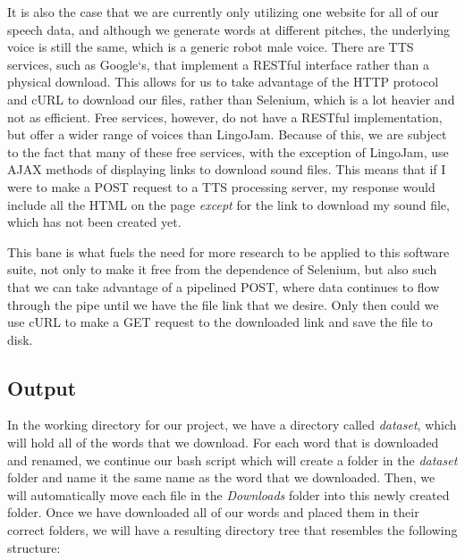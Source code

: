 \documentclass[12pt,journal,compsoc]{IEEEtran}
\begin{document}
It is also the case that we are currently only utilizing one website for all of our speech data, and although we generate words at different pitches, the underlying voice is still the same, which is a generic robot male voice. There are TTS services, such as Google`s, that implement a RESTful interface rather than a physical download. This allows for us to take advantage of the HTTP protocol and cURL to download our files, rather than Selenium, which is a lot heavier and not as efficient. Free services, however, do not have a RESTful implementation, but offer a wider range of voices than LingoJam. Because of this, we are subject to the fact that many of these free services, with the exception of LingoJam, use AJAX methods of displaying links to download sound files. This means that if I were to make a POST request to a TTS processing server, my response would include all the HTML on the page \textit{except} for the link to download my sound file, which has not been created yet.

This bane is what fuels the need for more research to be applied to this software suite, not only to make it free from the dependence of Selenium, but also such that we can take advantage of a pipelined POST, where data continues to flow through the pipe until we have the file link that we desire. Only then could we use cURL to make a GET request to the downloaded link and save the file to disk. 

\subsection{Output}

In the working directory for our project, we have a directory called \textit{dataset}, which will hold all of the words that we download. For each word that is downloaded and renamed, we continue our bash script which will create a folder in the \textit{dataset} folder and name it the same name as the word that we downloaded. Then, we will automatically move each file in the \textit{Downloads} folder into this newly created folder. Once we have downloaded all of our words and placed them in their correct folders, we will have a resulting directory tree that resembles the following structure:

\end{document}
